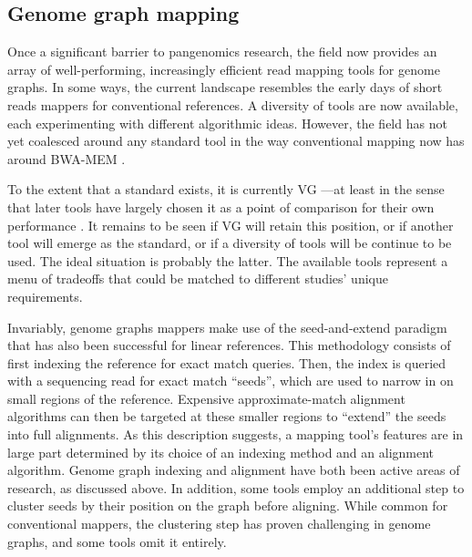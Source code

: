 
\subsection{Genome graph mapping}

Once a significant barrier to pangenomics research, the field now provides an array of well-performing, increasingly efficient read mapping tools for genome graphs. 
In some ways, the current landscape resembles the early days of short reads mappers for conventional references. 
A diversity of tools are now available, each experimenting with different algorithmic ideas. 
However, the field has not yet coalesced around any standard tool in the way conventional mapping now has around BWA-MEM \cite{Li_2013}. 

To the extent that a standard exists, it is currently VG \cite{Garrison_2018}---at least in the sense that later tools have largely chosen it as a point of comparison for their own performance \cite{Guo_2018,Kim_2019,Vaddadi_2019,Rautiainen_2019b}. 
It remains to be seen if VG will retain this position, or if another tool will emerge as the standard, or if a diversity of tools will be continue to be used. 
The ideal situation is probably the latter. 
The available tools represent a menu of tradeoffs that could be matched to different studies' unique requirements.

Invariably, genome graphs mappers make use of the seed-and-extend paradigm that has also been successful for linear references.
This methodology consists of first indexing the reference for exact match queries.
Then, the index is queried with a sequencing read for exact match ``seeds'', which are used to narrow in on small regions of the reference.
Expensive approximate-match alignment algorithms can then be targeted at these smaller regions to ``extend'' the seeds into full alignments. 
As this description suggests, a mapping tool's features are in large part determined by its choice of an indexing method and an alignment algorithm.
Genome graph indexing and alignment have both been active areas of research, as discussed above.
In addition, some tools employ an additional step to cluster seeds by their position on the graph before aligning.
While common for conventional mappers, the clustering step has proven challenging in genome graphs, and some tools omit it entirely.



